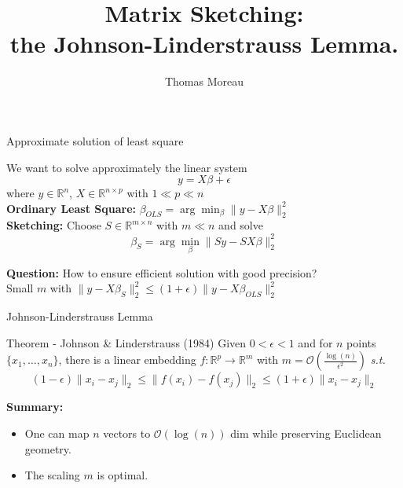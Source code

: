 \documentclass{beamer}
\institute{INRIA Saclay}
\author{Thomas Moreau}
\title{
    Matrix Sketching:\\
    the Johnson-Linderstrauss Lemma.
}
\def\biblio{
    \nobibliography{../../library}
    \def\biblio{}
}
\begin{document}
    \begin{frame}
        \titlepage
    \end{frame}


    \begin{frame}{Approximate solution of least square}

        We want to solve approximately the linear system
        \[
            y = X\beta + \epsilon
        \]
        where $y\in\mathbb R^n$, $X\in \mathbb R^{n\times p}$
        with $1 \ll p \ll n$\\[2em]

        \textbf{Ordinary Least Square:} $ \beta_{OLS} = \arg\min_{\beta}\|y - X\beta\|_2^2$\\[1em]

        \textbf{Sketching:}
        Choose $S\in\mathbb R^{m\times n}$  with $m \ll n$ and solve
        \[
            \beta_S = \arg\min_{\beta}\|Sy - SX\beta\|_2^2
        \]

        \textbf{Question:} How to ensure efficient solution with good precision?\\[1em]
        {\centering Small $m$ with
        $\|y - X\beta_S\|_2^2 \le (1 + \epsilon)\|y - X\beta_{OLS}\|_2^2$}

    \end{frame}

    \begin{frame}{Johnson-Linderstrauss Lemma}
        \begin{block}{Theorem - \textcolor{linkcolor}{Johnson \& Linderstrauss (1984)}}
            Given $0 < \epsilon < 1$ and
            for $n$ points $\{x_1, \dots, x_n\}$, there is a linear embedding $f: \mathbb R^p \to \mathbb R^m$ with $m = \mathcal O(\frac{\log(n)}{\epsilon^2})$ \emph{s.t.}
            \[
                (1-\epsilon)\|x_i - x_j\|_2
                    \le \|f(x_i) - f(x_j)\|_2
                    \le (1+\epsilon)\|x_i - x_j\|_2
            \]
        \end{block}

        \textbf{Summary:}
        \begin{itemize}
            \item One can map $n$ vectors to $\mathcal O(\log(n))$ dim while preserving Euclidean geometry.
            \item The scaling $m$ is optimal.
        \end{itemize}
    \end{frame}
\end{document}
